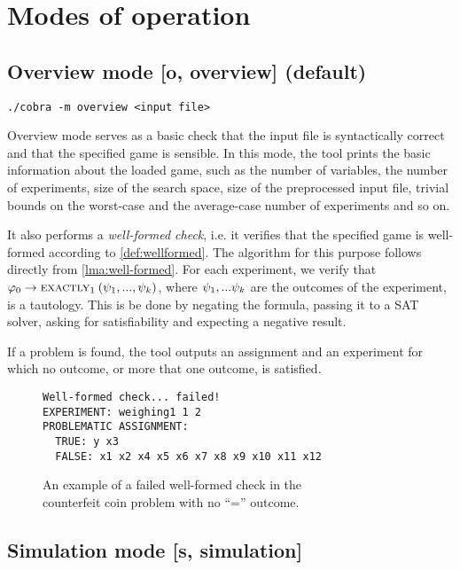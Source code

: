\section{Modes of operation}\label{s:cobra-modes}

\subsection{Overview mode [o, overview] (default)}

\centerline{\texttt{./cobra -m overview <input file> }}
\medskip

Overview mode serves as a basic check that the input file is
  syntactically correct and that the specified game is sensible.
In this mode, the tool prints the basic information about the loaded game, such as
  the number of variables, the number of experiments, size of the search space,
  size of the preprocessed input file,
  trivial bounds on the worst-case and the average-case number of experiments and so on.

It also performs a \emph{well-formed check}, i.e. it verifies that the
  specified game is well-formed according to \autoref{def:wellformed}.
The algorithm for this purpose follows directly from \autoref{lma:well-formed}.
For each experiment, we verify that
  $\varphi_0->\textsc{exactly}_{1}\:(\psi_1, ..., \psi_k)$,
  where $\psi_1,...\psi_k$ are the outcomes of the experiment,
  is a tautology.
This is be done by negating the formula,
  passing it to a SAT solver, asking for satisfiability
  and expecting a negative result.

If a problem is found, the tool outputs an assignment and an experiment
  for which no outcome, or more that one outcome, is satisfied.

\begin{figure}[ht]
\begin{lstlisting}[xleftmargin=.2\textwidth]
Well-formed check... failed!
EXPERIMENT: weighing1 1 2
PROBLEMATIC ASSIGNMENT:
  TRUE: y x3
  FALSE: x1 x2 x4 x5 x6 x7 x8 x9 x10 x11 x12
\end{lstlisting}
\caption{An example of a failed well-formed check in the\\ counterfeit coin problem
 with no ``='' outcome.}
\end{figure}

\subsection{Simulation mode [s, simulation]}

